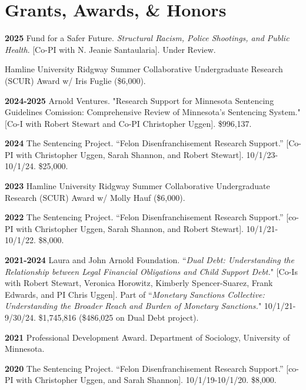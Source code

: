 \documentclass[letterpaper]{article}
\newenvironment{publist}{%
  \begin{list}{}{%
    \setlength{\leftmargin}{0cm}   %
    \setlength{\labelwidth}{2cm}     %
    \setlength{\labelsep}{0.5cm}     %
  }%
}{%
  \end{list}%
}
\begin{document}
\section*{\textbf{Grants, Awards, \& Honors}}

\begin{publist}

\item[\textbf{2025}] Fund for a Safer Future. \textit{Structural Racism, Police Shootings, and Public Health}. [Co-PI with N. Jeanie Santaularia]. Under Review. 

\item Hamline University Ridgway Summer Collaborative Undergraduate Research (SCUR) Award w/ Iris Fuglie (\$6,000).

\item[\textbf{2024-2025}] Arnold Ventures. "Research Support for Minnesota Sentencing Guidelines Comission: Comprehensive Review of Minnesota's Sentencing System." [Co-I with Robert Stewart and Co-PI Christopher Uggen]. \$996,137. 

\item[\textbf{2024}] The Sentencing Project. “Felon Disenfranchisement Research Support.” [Co-PI with Christopher Uggen, Sarah Shannon, and Robert Stewart]. 10/1/23-10/1/24. \$25,000.

\item[\textbf{2023}] Hamline University Ridgway Summer Collaborative Undergraduate Research (SCUR) Award w/ Molly Hauf (\$6,000).

\item[\textbf{2022}]The Sentencing Project. “Felon Disenfranchisement Research Support.” [co-PI with Christopher Uggen, Sarah Shannon, and Robert Stewart]. 10/1/21-10/1/22. \$8,000.

\item[\textbf{2021-2024}]  Laura and John Arnold Foundation. ``\textit{Dual Debt: Understanding the Relationship between Legal Financial Obligations and Child Support Debt.}" [Co-Is with Robert Stewart, Veronica Horowitz, Kimberly Spencer-Suarez, Frank Edwards, and PI Chris Uggen]. Part of ``\textit{Monetary Sanctions Collective: Understanding the Broader Reach and Burden of Monetary Sanctions.}" 10/1/21-9/30/24. \$1,745,816 (\$486,025 on Dual Debt project).

\item[\textbf{2021}] Professional Development Award. Department of Sociology, University of Minnesota. 

\item[\textbf{2020}] The Sentencing Project. “Felon Disenfranchisement Research Support.” [co-PI with Christopher Uggen, and Sarah Shannon]. 10/1/19-10/1/20. \$8,000.


\end{publist}
\end{document}
